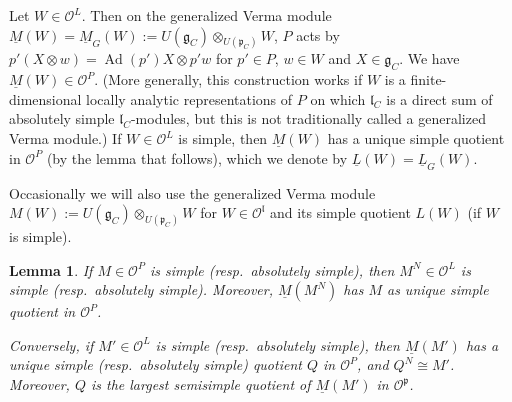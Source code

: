 \documentclass[a4paper]{amsart}
\numberwithin{equation}{section}
\newtheorem{lem}[thm]{Lemma}
\theoremstyle{remark}
\theoremstyle{definition}
\DeclareMathOperator{\Ad}{Ad}
\begin{document}
Let $W\in \mathcal{O}^{L}$.
Then on the generalized Verma module $\underline{M}(W) = \underline{M}_{G}(W) := U(\mathfrak{g}_{C})\otimes_{U(\mathfrak{p}_{C})}W$, $P$ acts by $p'(X\otimes w) = \Ad(p')X\otimes p'w$ for $p'\in P$, $w\in W$ and $X\in \mathfrak{g}_{C}$.
We have $\underline{M}(W)\in \mathcal{O}^{P}$.
(More generally, this construction works if $W$ is a finite-dimensional locally analytic representations of $P$ on which $\mathfrak{l}_{C}$ is a direct sum of absolutely simple $\mathfrak{l}_{C}$-modules, but this is not traditionally called a generalized Verma module.)
If $W\in \mathcal O^L$ is simple, then $\underline{M}(W)$ has a unique simple quotient in $\mathcal{O}^{P}$ (by the lemma that follows), which we denote by $\underline{L}(W) = \underline{L}_{G}(W)$.

Occasionally we will also use the generalized Verma module $M(W) := U(\mathfrak{g}_{C})\otimes_{U(\mathfrak{p}_{C})} W$ for $W \in \mathcal O^{\mathfrak l}$ and its simple quotient $L(W)$ (if $W$ is simple).

\begin{lem}\label{lm:N-invts}
  If $M \in \mathcal{O}^{P}$ is simple (resp.\ absolutely simple), then $M^N \in \mathcal{O}^{L}$ is simple (resp.\ absolutely simple). 
  Moreover, $\underline M(M^N)$ has $M$ as unique simple quotient in $\mathcal{O}^{P}$. 

  Conversely, if $M' \in \mathcal{O}^{L}$ is simple (resp.\ absolutely simple), then $\underline M(M')$ has a unique simple (resp.\ absolutely simple)
  quotient $Q$ in $\mathcal{O}^{P}$, and $Q^N \cong M'$. Moreover, $Q$ is the largest semisimple quotient of $\underline M(M')$ in $\mathcal{O}^{\mathfrak{p}}$.
\end{lem}
\end{document}
